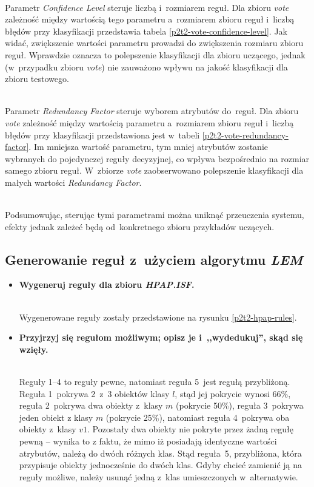 \begin{itemize}
	
	\\Parametr \emph{Confidence Level} steruje liczbą i~rozmiarem reguł. Dla zbioru \emph{vote} zależność między wartością tego parametru a~rozmiarem zbioru reguł i~liczbą błędów przy klasyfikacji przedstawia tabela \ref{p2t2-vote-confidence-level}. Jak widać, zwiększenie wartości parametru prowadzi do zwiększenia rozmiaru zbioru reguł. Wprawdzie oznacza to polepszenie klasyfikacji dla zbioru uczącego, jednak (w~przypadku zbioru \emph{vote}) nie zauważono wpływu na jakość klasyfikacji dla zbioru testowego.

	
	\\Parametr \emph{Redundancy Factor} steruje wyborem atrybutów do~reguł. Dla zbioru \emph{vote} zależność między wartością parametru a~rozmiarem zbioru reguł i~liczbą błędów przy klasyfikacji przedstawiona jest w~tabeli \ref{p2t2-vote-redundancy-factor}. Im mniejsza wartość parametru, tym mniej atrybutów zostanie wybranych do pojedynczej reguły decyzyjnej, co wpływa bezpośrednio na rozmiar samego zbioru reguł. W~zbiorze \emph{vote} zaobserwowano polepszenie klasyfikacji dla małych wartości \emph{Redundancy Factor}.

	\\Podsumowując, sterując tymi parametrami można uniknąć przeuczenia systemu, efekty jednak zależeć będą od~konkretnego zbioru przykładów uczących.
\end{itemize}


	\subsection{Generowanie reguł z~użyciem algorytmu \emph{LEM}}
	\label{sec:lem}

\begin{itemize}
\item \textbf{Wygeneruj reguły dla zbioru \emph{HPAP.ISF}.}

	
	\\Wygenerowane reguły zostały przedstawione na rysunku \ref{p2t2-hpap-rules}.

\item \textbf{Przyjrzyj się regułom możliwym; opisz je i~,,wydedukuj'', skąd się wzięły.}

	\\Reguły 1--4 to reguły pewne, natomiast reguła 5~jest regułą przybliżoną. Reguła 1~pokrywa 2~z~3 obiektów klasy $l$, stąd jej pokrycie wynosi 66\%, reguła 2~pokrywa dwa obiekty z~klasy $m$ (pokrycie 50\%), reguła 3~pokrywa jeden obiekt z klasy $m$ (pokrycie 25\%), natomiast reguła 4~pokrywa oba obiekty z~klasy $v1$. Pozostały dwa obiekty nie pokryte przez żadną regułę pewną -- wynika to z faktu, że mimo iż posiadają identyczne wartości atrybutów, należą do dwóch różnych klas. Stąd reguła~5, przybliżona, która przypisuje obiekty jednocześnie do dwóch klas. Gdyby chcieć zamienić ją na reguły możliwe, należy usunąć jedną z~klas umieszczonych w~alternatywie.

\end{itemize}

